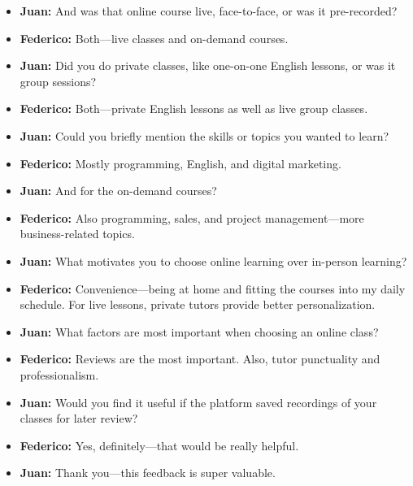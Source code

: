 \begin{enumerate}
\begin{itemize}
        \item \textbf{Juan:} And was that online course live, face-to-face, or was it pre-recorded?
        \item \textbf{Federico:} Both—live classes and on-demand courses.
        \item \textbf{Juan:} Did you do private classes, like one-on-one English lessons, or was it group sessions?
        \item \textbf{Federico:} Both—private English lessons as well as live group classes.
        \item \textbf{Juan:} Could you briefly mention the skills or topics you wanted to learn?
        \item \textbf{Federico:} Mostly programming, English, and digital marketing.
        \item \textbf{Juan:} And for the on-demand courses?
        \item \textbf{Federico:} Also programming, sales, and project management—more business-related topics.
        \item \textbf{Juan:} What motivates you to choose online learning over in-person learning?
        \item \textbf{Federico:} Convenience—being at home and fitting the courses into my daily schedule.
        For live lessons, private tutors provide better personalization.
        \item \textbf{Juan:} What factors are most important when choosing an online class?
        \item \textbf{Federico:} Reviews are the most important.
        Also, tutor punctuality and professionalism.
        \item \textbf{Juan:} Would you find it useful if the platform saved recordings of your classes for later review?
        \item \textbf{Federico:} Yes, definitely—that would be really helpful.
        \item \textbf{Juan:} Thank you—this feedback is super valuable.
    \end{itemize}
\end{enumerate}
